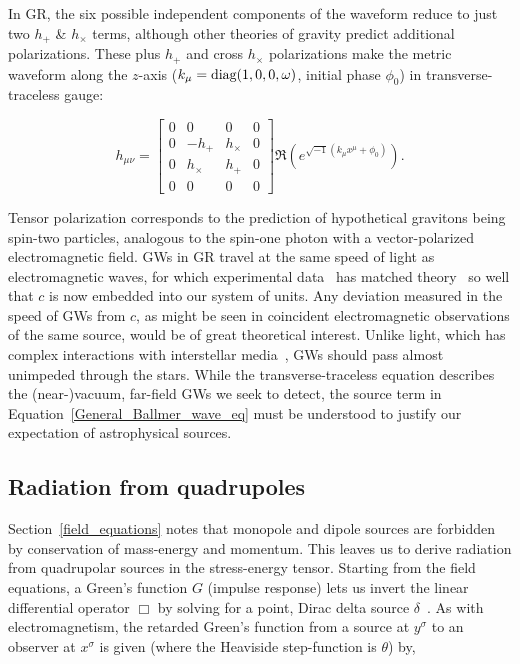In GR, the six possible independent components of the waveform reduce to just two $h_+$ \& $h_\times$ terms, although other theories of gravity predict additional polarizations.
These plus $h_+$ and cross $h_\times$ polarizations make the metric waveform along the $z$-axis ($k_\mu = \textup{diag}(1,0,0,\omega)$, initial phase $\phi_0$) in transverse-traceless gauge:

\begin{equation}
h_{\mu\nu} =
\left[
\begin{array}{cccc}
0 & 0 & 0 & 0\\
0 & -h_+ & h_\times & 0 \\
0 & h_\times & h_+ & 0\\
0 & 0 & 0 & 0
\end{array} \right] \Re \left(e^{\sqrt{-1} (k_\mu x^\mu + \phi_0)} \right).
\label{GW-matrix-eq}
\end{equation}

\noindent Tensor polarization corresponds to the prediction of hypothetical gravitons being spin-two particles, analogous to the spin-one photon with a vector-polarized electromagnetic field.
GWs in GR travel at the same speed of light as electromagnetic waves, for which experimental data~\cite{CODATA} has matched theory~\cite{GriffithsE} so well that $c$ is now embedded into our system of units.
Any deviation measured in the speed of GWs from $c$, as might be seen in coincident electromagnetic observations of the same source, would be of great theoretical interest. 
Unlike light, which has complex interactions with interstellar media~\cite{Caldwell1981,McKee1977}, GWs should pass almost unimpeded through the stars. 
While the transverse-traceless equation describes the (near-)vacuum, far-field GWs we seek to detect, the source term in Equation~\ref{General_Ballmer_wave_eq} must be understood to justify our expectation of astrophysical sources.


        \subsection{Radiation from quadrupoles}
        \label{radiation}

Section~\ref{field_equations} notes that monopole and dipole sources are forbidden by conservation of mass-energy and momentum. This leaves us to derive radiation from quadrupolar sources in the stress-energy tensor.
Starting from the field equations, a Green's function $G$ (impulse response) lets us invert the linear differential operator $\Box$ by solving for a point, Dirac delta source $\delta$~\cite{Carroll1997}.
As with electromagnetism, the retarded Green's function from a source at $y^\sigma$ to an observer at $x^\sigma$ is given (where the Heaviside step-function is $\theta$) by, 

